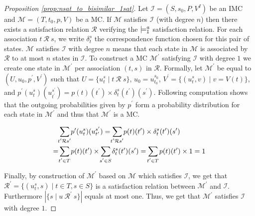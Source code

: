 \documentclass{llncs}
\newcommand{\mc}{\textnormal{MC}}
\newcommand{\imc}{\textnormal{IMC}}
\newcommand{\satisfactionImc}{\ensuremath{\models^{a}_{\tt{I}}}}
\newcommand{\ie} {{\em i.e.},\ }
\newcommand{\ssum}[2]{\sum\limits_{\mathclap{#1}^{#2}}}%
\begin{document}
\begin{proof}[Proposition \ref{prop:nsat_to_bisimilar_1sat}]
	Let $\mathcal{I} = (S,s_0,P,V^I)$ be an {\imc} and
	$\mathcal{M}=(T,t_0,p,V)$ be a \mc.
	If $\mathcal{M}$ satisfies $\mathcal{I}$ (with degree $n$)
	then there exists a satisfaction relation $\mathcal{R}$ verifying 
    the $\satisfactionImc$ satisfaction relation.	
	For each association $t~\mathcal{R}~s$,
	we write $\delta_t^s$ the correspondence function chosen for this pair of states.
	$\mathcal{M}$ satisfies $\mathcal{I}$ with degree $n$ 
	means that each state in $\mathcal{M}$ is associated by $\mathcal{R}$ to at most $n$ states in $\mathcal{I}$.
	To construct a {\mc} $\mathcal{M^\prime}$ satisfying $\mathcal{I}$ with degree $1$
	we create one state in $\mathcal{M^\prime}$ 
	per association $(t,s)$ in $\mathcal{R}$.
	Formally, let $\mathcal{M^\prime}$ be equal to $(U, u_0, p^\prime, V^\prime)$ such that 
	$U = \{u_t^s \mid t~\mathcal{R}~s\}$, 
	$u_0 = u_{t_0}^{s_0}$, 
	$V^\prime = \{(u_t^s, v) \mid v = V(t)\}$, and
	$p^\prime(u_t^s)(u_{t^\prime}^{s^\prime}) = p(t)(t^\prime) \times \delta_t^s(t^\prime)(s^\prime)$.
	Following computation shows that the outgoing probabilities given by $p^\prime$ form a probability distribution
	for each state in $\mathcal{M^\prime}$
	and thus that $\mathcal{M^\prime}$ is a {\mc}.
	\par\noindent
	\begin{align*}
		&
		\ssum{t^\prime \mathcal{R} s^\prime}{} p^\prime(u_t^s)(u_{t^\prime}^{s^\prime})
		=
		\ssum{t^\prime \mathcal{R} s^\prime}{}  p(t)(t^\prime) \times \delta_t^s(t^\prime)(s^\prime) \\
		= &
		\ssum{t^\prime \in T}{}  p(t)(t^\prime) \times \ssum{s^\prime \in S}{} \delta_t^s(t^\prime)(s^\prime)
		=
		\ssum{t^\prime \in T}{}  p(t)(t^\prime) \times 1	
		=
		1
	\end{align*}
	
	Finally, by construction of $\mathcal{M^\prime}$ based on $\mathcal{M}$
	which satisfies $\mathcal{I}$,
	we get that $\mathcal{R^\prime} = \{(u_t^s,s) \mid t \in T, s \in S \}$
	is a satisfaction relation between $\mathcal{M^\prime}$ and $\mathcal{I}$.
	Furthermore $|\{s \mid u~\mathcal{R^\prime}~s\}|$ equals at most one.
	Thus, we get that $\mathcal{M^\prime}$ satisfies $\mathcal{I}$ with degree $1$.
	

\end{proof}
\end{document}
